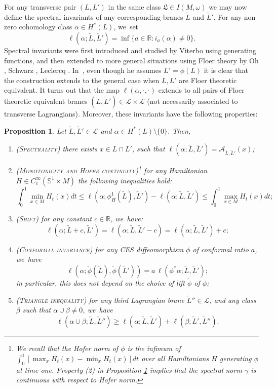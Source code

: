 \documentclass[10pt]{amsart}
\newtheorem{prop}[thm]{Proposition}
\theoremstyle{definition}
\newcommand {\LL}{{\mathcal L}}
\newcommand{\R}{\mathbb{R}}
\newcommand{\fL}{\mathfrak {L}}
\begin{document}
For any transverse pair $(L, L')$ in the same class $\fL\in I(M,\omega)$ we may now define the spectral invariants of any corresponding branes $\tilde L$ and $\tilde L'$. For any non-zero cohomology class $\alpha\in H^*(L)$, we~set
\[
\ell(\alpha;\tilde L,\tilde L')=\inf\{a\in\R : i_a(\alpha)\neq 0\}.
\]
Spectral invariants were first introduced and studied by Viterbo \cite{Viterbo-STAGGF} using generating functions, and then extended to more general situations using Floer theory by Oh \cite{Oh-action-functional-I}, Schwarz \cite{Schwarz}, Leclercq \cite{Leclercq}. In~\cite{Leclercq}, even though he assumes $L'=\phi(L)$ it is clear that the construction extends to the general case when $L, L'$ are Floer theoretic equivalent.
It turns out that the map $\ell(\alpha, \cdot, \cdot)$ extends to all pairs of Floer theoretic equivalent branes $(\tilde L,\tilde L')\in\LL\times \LL$ (not necessarily associated to transverse Lagrangians). Moreover, these invariants have the following properties:

\begin{prop} Let $\tilde L,\tilde L'\in\LL$ and $\alpha\in H^*(L)\setminus\{0\}$. Then,
\label{prop:lag-spec-inv-properties}
\begin{enumerate}
\item \textsc{(Spectrality)} there exists $x\in L\cap L'$, such that $\ell(\alpha;\tilde L,\tilde L')=\mathcal A_{\tilde L,\tilde L'}(x)$;
\item \textsc{(Monotonicity and Hofer continuity)}\footnote{We recall that the Hofer norm of $\phi$ is the infimum of $\int_0^1 \left[\max_{x}H_t(x)-\min_{x}H_t(x)\right]dt$ over all Hamiltonians $H$ generating $\phi$ at time one. Property (2) in Proposition \ref{prop:lag-spec-inv-properties} implies that the spectral norm $\gamma$ is continuous with respect to Hofer norm.} for any Hamiltonian $H\in C^\infty_c(\mathbb{S}^1\times M)$ the following inequalities hold:
\[
\int_0^1\min_{x\in M} H_t(x) dt\leq \ell(\alpha;\phi_H^1(\tilde L),\tilde L')-\ell(\alpha;\tilde L,\tilde L')\leq \int_0^1\max_{x\in M} H_t(x) dt;
\]
\item \textsc{(Shift)} for any constant $c\in\R$, we~have:
\[
\ell(\alpha;\tilde L+c,\tilde L')=\ell(\alpha;\tilde L,\tilde L'-c)=\ell(\alpha;\tilde L,\tilde L')+c;
\]
\item \textsc{(Conformal invariance)} for any CES diffeomorphism $\phi$ of conformal ratio $a$, we~have
\[
\ell(\alpha;\tilde \phi(\tilde L),\tilde \phi(\tilde L'))=a\, \ell(\phi^*\alpha; \tilde L, \tilde L');
\]
in particular, this does not depend on the choice of lift $\tilde \phi$ of $\phi$;
\item \textsc{(Triangle inequality)} for any third Lagrangian brane $\tilde L''\in\LL$, and any class $\beta$ such that $\alpha\cup\beta\neq 0$, we~have
\[
\ell(\alpha\cup\beta;\tilde L,\tilde L'')\geq \ell(\alpha;\tilde L,\tilde L')+\ell(\beta;\tilde L',\tilde L'').
\]
\end{enumerate}
\end{prop}
\end{document}
